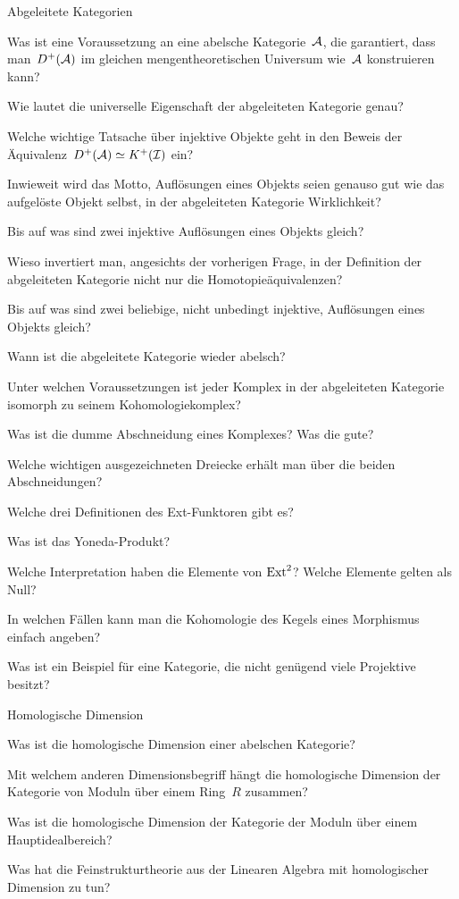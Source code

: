 \documentclass{uebblatt}
\begin{document}
\begin{aufgabeE}{Abgeleitete Kategorien}
\item Was ist eine Voraussetzung an eine abelsche Kategorie~$\mathcal{A}$, die
garantiert, dass man~$D^+(\mathcal{A})$ im gleichen mengentheoretischen Universum wie~$\mathcal{A}$
konstruieren kann?
\item Wie lautet die universelle Eigenschaft der abgeleiteten Kategorie
genau?
\item Welche wichtige Tatsache über injektive Objekte geht in den Beweis der
Äquivalenz~$D^+(\mathcal{A}) \simeq K^+(\mathcal{I})$ ein?
\item Inwieweit wird das Motto, Auflösungen eines Objekts seien genauso gut wie
das aufgelöste Objekt selbst, in der abgeleiteten Kategorie Wirklichkeit?
\item Bis auf was sind zwei injektive Auflösungen eines Objekts gleich?
\item Wieso invertiert man, angesichts der vorherigen Frage, in der Definition
der abgeleiteten Kategorie nicht nur die Homotopieäquivalenzen?
\item Bis auf was sind zwei beliebige, nicht unbedingt injektive, Auflösungen
eines Objekts gleich?
\item Wann ist die abgeleitete Kategorie wieder abelsch?
\item Unter welchen Voraussetzungen ist jeder Komplex in der abgeleiteten
Kategorie isomorph zu seinem Kohomologiekomplex?
\item Was ist die dumme Abschneidung eines Komplexes? Was die gute?
\item Welche wichtigen ausgezeichneten Dreiecke erhält man über die beiden
Abschneidungen?
\item Welche drei Definitionen des Ext-Funktoren gibt es?
\item Was ist das Yoneda-Produkt?
\item Welche Interpretation haben die Elemente von $\mathrm{Ext}^2$? Welche Elemente
gelten als Null?
\item In welchen Fällen kann man die Kohomologie des Kegels eines Morphismus
einfach angeben?
\item Was ist ein Beispiel für eine Kategorie, die nicht genügend viele
Projektive besitzt?
\end{aufgabeE}

\begin{aufgabeE}{Homologische Dimension}
\item Was ist die homologische Dimension einer abelschen Kategorie?
\item Mit welchem anderen Dimensionsbegriff hängt die homologische Dimension
der Kategorie von Moduln über einem Ring~$R$ zusammen?
\item Was ist die homologische Dimension der Kategorie der Moduln über einem
Hauptidealbereich?
\item Was hat die Feinstrukturtheorie aus der Linearen Algebra mit
homologischer Dimension zu tun?
\end{aufgabeE}
\end{document}
